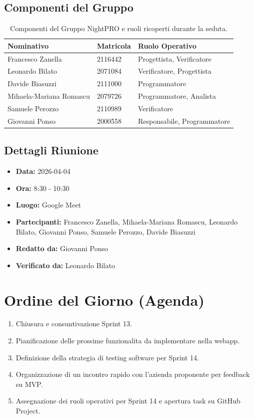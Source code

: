 \documentclass[a4paper, 11pt, oneside]{scrartcl} %
\begin{document}
\subsection{Componenti del Gruppo}
\begin{table}[h!]
\centering
\begin{tabular}{@{}lll@{}}
\toprule
\textbf{Nominativo} & \textbf{Matricola} & \textbf{Ruolo Operativo} \\
\midrule
Francesco Zanella & 2116442 & Progettista, Verificatore \\
Leonardo Bilato & 2071084 & Verificatore, Progettista \\
Davide Biasuzzi & 2111000 & Programmatore \\
Mihaela-Mariana Romascu & 2079726 & Programmatore, Analista \\
Samuele Perozzo & 2110989 & Verificatore \\
Giovanni Ponso & 2000558 & Responsabile, Programmatore \\
\bottomrule
\end{tabular}
\caption{Componenti del Gruppo NightPRO e ruoli ricoperti durante la seduta.}
\end{table}

\subsection{Dettagli Riunione}
\begin{itemize}
    \item \textbf{Data:} 2026-04-04
    \item \textbf{Ora:} 8:30 - 10:30
    \item \textbf{Luogo:} Google Meet
    \item \textbf{Partecipanti:} Francesco Zanella, Mihaela-Mariana Romascu, Leonardo Bilato, Giovanni Ponso, Samuele Perozzo, Davide Biasuzzi
    \item \textbf{Redatto da:} Giovanni Ponso
    \item \textbf{Verificato da:} Leonardo Bilato
\end{itemize}

\newpage
\section{Ordine del Giorno (Agenda)}
\begin{enumerate}
    \item Chiusura e consuntivazione Sprint 13.
    \item Pianificazione delle prossime funzionalita da implementare nella webapp.
    \item Definizione della strategia di testing software per Sprint 14.
    \item Organizzazione di un incontro rapido con l'azienda proponente per feedback su MVP.
    \item Assegnazione dei ruoli operativi per Sprint 14 e apertura task su GitHub Project.
\end{enumerate}
\end{document}
